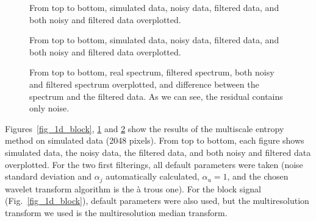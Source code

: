 \begin{figure}[htb]
\centerline{
\vbox{ 
}}
\caption{From top to bottom, simulated data, noisy data, filtered data,
and both noisy and filtered data overplotted.}
\label{fig_1d_ndoppler}
\end{figure}

\begin{figure}[htb]
\centerline{
\vbox{ 
}}
\caption{From top to bottom, simulated data, noisy data, filtered data,
and both noisy and filtered data overplotted.}
\label{fig_1d_bump}
\end{figure}

\begin{figure}[htb]
\centerline{
\vbox{ 
}}
\caption{From top to bottom, real spectrum, filtered spectrum,  
 both noisy and filtered spectrum overplotted, and difference between the spectrum
 and the filtered data. As we can see, the residual contains only noise.}
\label{fig_1d_lit6n}
\end{figure}

 
Figures~\ref{fig_1d_block}, \ref{fig_1d_ndoppler} and 
\ref{fig_1d_bump} show the
results of the multiscale entropy method on 
simulated data (2048 pixels).  From 
top to bottom, each figure shows simulated data, the noisy data, 
the filtered data, and both noisy and filtered data overplotted. 
For the two first filterings, all default parameters were taken (noise 
standard deviation and $\alpha_j$ automatically calculated, $\alpha_u=1$,
and the chosen wavelet transform algorithm is the \`a trous one). For
the block signal (Fig.~\ref{fig_1d_block}), default parameters were
also used, but the multiresolution transform we used is the multiresolution
median transform.
 
